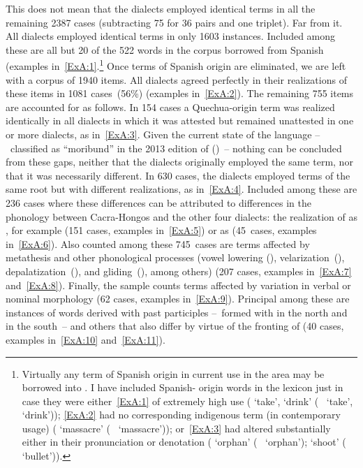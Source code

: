 This does not mean that the dialects employed identical terms in all the remaining 2387 cases (subtracting 75 for 36 pairs and one triplet). Far from it. All dialects employed identical terms in only 1603 instances. Included among these are all but 20 of the 522 words in the corpus borrowed from Spanish (examples in~\ref{ExA:1}.\footnote{Virtually any term of Spanish origin in current use in the area may be borrowed into \SYQ. I have included Spanish- origin words in the lexicon just in case they were either~\ref{ExA:1} of extremely high use ( ‘take’, ‘drink’ (\Sp~ ‘take’, ‘drink’)); \ref{ExA:2} had no corresponding indigenous term (in contemporary usage) ( ‘massacre’ (\Sp~ ‘massacre’)); or~\ref{ExA:3} had altered substantially either in their pronunciation or denotation ( ‘orphan’ (\Sp~ ‘orphan’);  ‘shoot’ (\Sp~ ‘bullet’)).} Once terms of Spanish origin are eliminated, we are left with a corpus of 1940 items. All dialects agreed perfectly in their realizations of these items in 1081 cases~(56\%) (examples in~\ref{ExA:2}). The remaining 755 items are accounted for as follows. In 154 cases a Quechua-origin term was realized identically in all dialects in which it was attested but remained unattested in one or more dialects, as in~\ref{ExA:3}. Given the current state of the language --~classified as “moribund” in the 2013 edition of \underline{} \citet{ethnologue}()~-- nothing can be concluded from these gaps, neither that the dialects originally employed the same term, nor that it was necessarily different. In 630 cases, the dialects employed terms of the same root but with different realizations, as in~\ref{ExA:4}. Included among these are 236 cases where these differences can be attributed to differences in the phonology between Cacra-Hongos and the other four dialects: the realization of \textipa{*[r]} as \textipa{[l]}, for example (151 cases, examples in~\ref{ExA:5}) or  as \textipa{[h]} (45~cases, examples in~\ref{ExA:6}). Also counted among these 745~cases are terms affected by metathesis and other phonological processes (vowel lowering (), velarization~(), depalatization~(), and gliding~(), among others) (207 cases, examples in~\ref{ExA:7} and~\ref{ExA:8}). Finally, the sample counts terms affected by variation in verbal or nominal morphology (62 cases, examples in~\ref{ExA:9}). Principal among these are instances of words derived with past participles --~formed with  in the north and  in the south~-- and others that also differ by virtue of the fronting of  (40 cases, examples in~\ref{ExA:10} and~\ref{ExA:11}).

